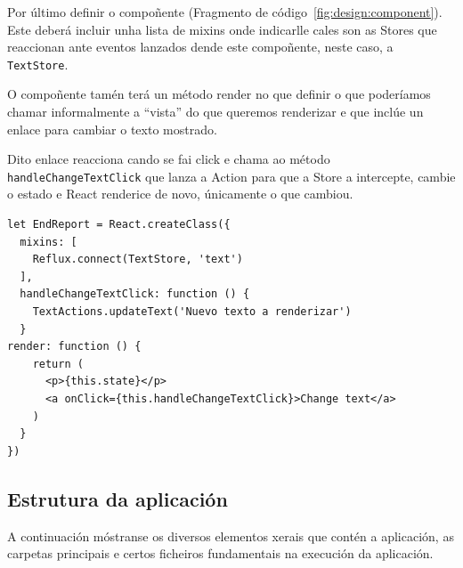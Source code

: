     Por último definir o compoñente (Fragmento de 
código~\ref{fig:design:component}). Este deberá incluir unha lista de mixins 
onde indicarlle cales son as Stores que reaccionan ante eventos lanzados 
dende este compoñente, neste caso, a \lstinline{TextStore}.

    O compoñente tamén terá un método render no que definir o que poderíamos 
chamar informalmente a ``vista'' do que queremos renderizar e que inclúe un 
enlace para cambiar o texto mostrado.

    Dito enlace reacciona cando se fai click e chama ao método 
\lstinline{handleChangeTextClick} que lanza a Action para que a Store a 
intercepte, cambie o estado e React renderice de novo, únicamente o que cambiou.

    \lstset{}
     \begin{lstlisting}[caption=Exemplo de compoñente de React., 
label=fig:design:component]
let EndReport = React.createClass({
  mixins: [
    Reflux.connect(TextStore, 'text')
  ],
  handleChangeTextClick: function () {
    TextActions.updateText('Nuevo texto a renderizar')
  }
render: function () {
    return (
      <p>{this.state}</p>
      <a onClick={this.handleChangeTextClick}>Change text</a>
    )
  }
})
    \end{lstlisting}


    \subsection{Estrutura da aplicación}

    A continuación móstranse os diversos elementos xerais que contén a 
aplicación, as carpetas principais e certos ficheiros fundamentais na execución 
da aplicación.

